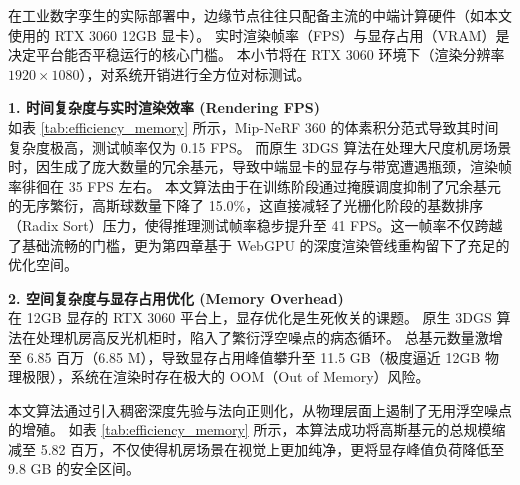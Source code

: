 在工业数字孪生的实际部署中，边缘节点往往只配备主流的中端计算硬件（如本文使用的 RTX 3060 12GB 显卡）。
实时渲染帧率（FPS）与显存占用（VRAM）是决定平台能否平稳运行的核心门槛。
本小节将在 RTX 3060 环境下（渲染分辨率 $1920 \times 1080$），对系统开销进行全方位对标测试。

\textbf{1. 时间复杂度与实时渲染效率 (Rendering FPS)} \\
如表 \ref{tab:efficiency_memory} 所示，Mip-NeRF 360 的体素积分范式导致其时间复杂度极高，测试帧率仅为 0.15 FPS。
而原生 3DGS 算法在处理大尺度机房场景时，因生成了庞大数量的冗余基元，导致中端显卡的显存与带宽遭遇瓶颈，渲染帧率徘徊在 35 FPS 左右。
本文算法由于在训练阶段通过掩膜调度抑制了冗余基元的无序繁衍，高斯球数量下降了 15.0\%，这直接减轻了光栅化阶段的基数排序（Radix Sort）压力，使得推理测试帧率稳步提升至 41 FPS。这一帧率不仅跨越了基础流畅的门槛，更为第四章基于 WebGPU 的深度渲染管线重构留下了充足的优化空间。

\textbf{2. 空间复杂度与显存占用优化 (Memory Overhead)} \\
在 12GB 显存的 RTX 3060 平台上，显存优化是生死攸关的课题。
原生 3DGS 算法在处理机房高反光机柜时，陷入了繁衍浮空噪点的病态循环。
总基元数量激增至 6.85 百万（6.85 M），导致显存占用峰值攀升至 11.5 GB（极度逼近 12GB 物理极限），系统在渲染时存在极大的 OOM（Out of Memory）风险。

本文算法通过引入稠密深度先验与法向正则化，从物理层面上遏制了无用浮空噪点的增殖。
如表 \ref{tab:efficiency_memory} 所示，本算法成功将高斯基元的总规模缩减至 5.82 百万，不仅使得机房场景在视觉上更加纯净，更将显存峰值负荷降低至 9.8 GB 的安全区间。

\begin{table}[htbp]
    \centering
    \caption{类工业场景下算法实时渲染帧率、三维基元冗余规模与系统显存开销综合对标（测试平台：RTX 3060 12GB，渲染分辨率：1920$\times$1080）}
    \label{tab:efficiency_memory}
    \renewcommand{\arraystretch}{1.25}
    \setlength{\tabcolsep}{5pt}
    \vspace{0.2cm}
\end{table}

